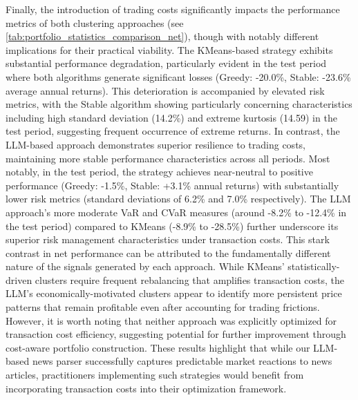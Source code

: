 
Finally, the introduction of trading costs significantly impacts the performance metrics of both clustering approaches (see \cref{tab:portfolio_statistics_comparison_net}), though with notably different implications for their practical viability. The KMeans-based strategy exhibits substantial performance degradation, particularly evident in the test period where both algorithms generate significant losses (Greedy: -20.0\%, Stable: -23.6\% average annual returns). This deterioration is accompanied by elevated risk metrics, with the Stable algorithm showing particularly concerning characteristics including high standard deviation (14.2\%) and extreme kurtosis (14.59) in the test period, suggesting frequent occurrence of extreme returns.
In contrast, the LLM-based approach demonstrates superior resilience to trading costs, maintaining more stable performance characteristics across all periods. Most notably, in the test period, the strategy achieves near-neutral to positive performance (Greedy: -1.5\%, Stable: +3.1\% annual returns) with substantially lower risk metrics (standard deviations of 6.2\% and 7.0\% respectively). The LLM approach's more moderate VaR and CVaR measures (around -8.2\% to -12.4\% in the test period) compared to KMeans (-8.9\% to -28.5\%) further underscore its superior risk management characteristics under transaction costs.
This stark contrast in net performance can be attributed to the fundamentally different nature of the signals generated by each approach. While KMeans' statistically-driven clusters require frequent rebalancing that amplifies transaction costs, the LLM's economically-motivated clusters appear to identify more persistent price patterns that remain profitable even after accounting for trading frictions. However, it is worth noting that neither approach was explicitly optimized for transaction cost efficiency, suggesting potential for further improvement through cost-aware portfolio construction. These results highlight that while our LLM-based news parser successfully captures predictable market reactions to news articles, practitioners implementing such strategies would benefit from incorporating transaction costs into their optimization framework.
